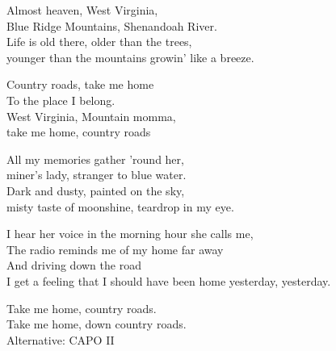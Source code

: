 
\ve{}
Almost heaven, West Virginia,\\
Blue Ridge Mountains, Shenandoah River.\\\textit{}
Life is old there, older than the trees,\\
younger than the mountains growin' like a breeze.

\cho{}
Country roads, take me home\\
To the place I belong.\\
West Virginia, Mountain momma,\\
take me home, country roads

\ve{}
All my memories gather 'round her,\\
miner's lady, stranger to blue water.\\
Dark and dusty, painted on the sky,\\
misty taste of moonshine, teardrop in my eye.

\cho{}

\ve{}
I hear her voice in the morning hour she calls me,\\
The radio reminds me of my home far away\\
And driving down the road\\
I get a feeling that I should have been home yesterday, yesterday.

\cho{}

\re{}
Take me home, country roads.\\
Take me home, down country roads.\\

Alternative: CAPO II\\
\\


\esong